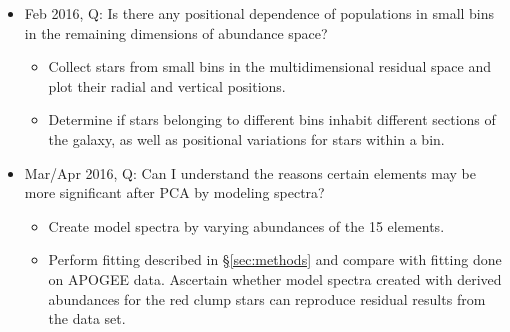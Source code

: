 \documentclass[preprint]{aastex}
\begin{document}
\begin{itemize}
\begin{itemize}
\end{itemize}
\item Feb 2016, Q: Is there any positional dependence of populations in small bins in the remaining dimensions of abundance space?
\begin{itemize} 
\item Collect stars from small bins in the multidimensional residual space and plot their radial and vertical positions.
\item Determine if stars belonging to different bins inhabit different sections of the galaxy, as well as positional variations for stars within a bin.
\end{itemize}
\item Mar/Apr 2016, Q: Can I understand the reasons certain elements may be more significant after PCA by modeling spectra?
\begin{itemize}
\item Create model spectra by varying abundances of the 15 elements.
\item Perform fitting described in \S\ref{sec:methods} and compare with fitting done on APOGEE data. Ascertain whether model spectra created with derived abundances for the red clump stars can reproduce residual results from the data set.
\end{itemize}
\end{itemize}


\end{document}
